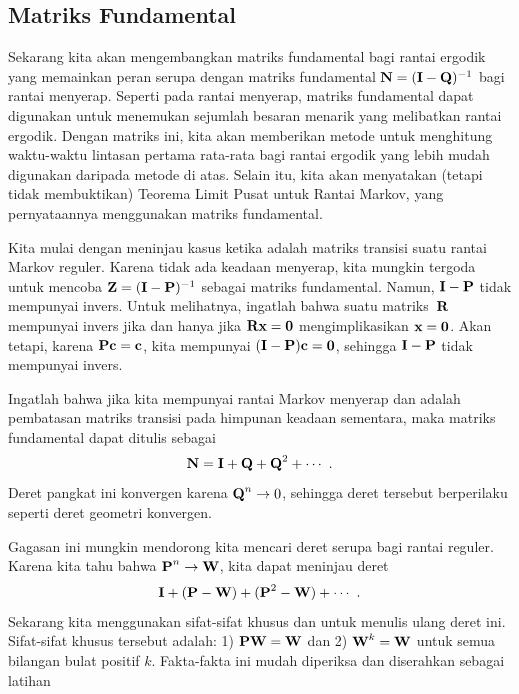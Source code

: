 \subsection*{Matriks Fundamental}
Sekarang kita akan mengembangkan matriks fundamental bagi rantai ergodik yang
memainkan peran serupa dengan matriks fundamental ${\mbox{\bf N}\/} = ({\mbox{\bf I}\/} - {\mbox{\bf Q}\/})^{-1}$ bagi rantai menyerap. Seperti pada rantai menyerap, matriks fundamental
dapat digunakan untuk menemukan sejumlah besaran menarik yang melibatkan rantai
ergodik. Dengan matriks ini, kita akan memberikan metode untuk menghitung
waktu-waktu lintasan pertama rata-rata bagi rantai ergodik yang lebih mudah
digunakan daripada metode di atas. Selain itu, kita akan menyatakan (tetapi tidak
membuktikan) Teorema Limit Pusat untuk Rantai Markov, yang pernyataannya
menggunakan matriks fundamental.
\par
Kita mulai dengan meninjau kasus ketika  adalah matriks transisi suatu
rantai Markov reguler. Karena tidak ada keadaan menyerap, kita mungkin tergoda
untuk mencoba ${\mbox{\bf Z}\/} = ({\mbox{\bf I}\/} - {\mbox{\bf P}\/})^{-1}$ sebagai matriks fundamental.
Namun, ${\mbox{\bf I}\/} - {\mbox{\bf P}\/}$ tidak mempunyai invers. Untuk melihatnya, ingatlah
bahwa suatu matriks~${\mbox{\bf R}\/}$ mempunyai invers jika dan hanya jika
${\mbox{\bf R}\/} {\mbox{\bf x}\/} = {\mbox{\bf0}\/}$ mengimplikasikan ${\mbox{\bf x}\/} = {\mbox{\bf0}\/}$. Akan
tetapi, karena ${\mbox{\bf P}\/} {\mbox{\bf c}\/} = {\mbox{\bf c}\/}$, kita mempunyai
$({\mbox{\bf I}\/} - {\mbox{\bf P}\/}){\mbox{\bf c}\/} = {\mbox{\bf0}\/}$, sehingga ${\mbox{\bf I}\/} - {\mbox{\bf P}\/}$ tidak
mempunyai invers.
\par
Ingatlah bahwa jika kita mempunyai rantai Markov menyerap dan  adalah
pembatasan matriks transisi pada himpunan keadaan sementara, maka matriks
fundamental  dapat ditulis sebagai
$${\mbox{\bf N}\/} = {\mbox{\bf I}\/} + {\mbox{\bf Q}\/} + {\mbox{\bf Q}\/}^2 + \cdots\ .$$
Deret pangkat ini konvergen karena ${\mbox{\bf Q}\/}^n \rightarrow 0$, sehingga deret
tersebut berperilaku seperti deret geometri konvergen.
\par
Gagasan ini mungkin mendorong kita mencari deret serupa bagi rantai reguler.
Karena kita tahu bahwa ${\mbox{\bf P}\/}^n \rightarrow {\mbox{\bf W}\/}$, kita dapat meninjau
deret
\begin{equation}
{\mbox{\bf I}\/} + ({\mbox{\bf P}\/} -{\mbox{\bf W}\/}) + ({\mbox{\bf P}\/}^2 - {\mbox{\bf W}\/}) + \cdots\ .\label{eq
11.5.8}
\end{equation}
Sekarang kita menggunakan sifat-sifat khusus  dan  untuk menulis
ulang deret ini. Sifat-sifat khusus tersebut adalah: 1)
${\mbox{\bf P}\/}{\mbox{\bf W}\/} = {\mbox{\bf W}\/}$ dan 2) ${\mbox{\bf W}\/}^k = {\mbox{\bf W}\/}$ untuk semua bilangan
bulat positif $k$. Fakta-fakta ini mudah diperiksa dan diserahkan sebagai latihan
